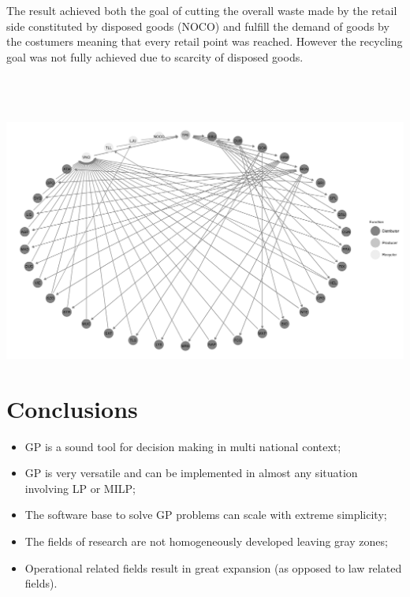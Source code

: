 \documentclass[a0,portrait]{a0poster}
\begin{document}
\begin{multicols}{2}
The result achieved both the goal of cutting the overall waste made by the retail side constituted by disposed goods (NOCO) and fulfill the demand of goods by the costumers meaning that every retail point was reached. However the recycling goal was not fully achieved due to scarcity of disposed goods.
\\
\\
\\
\\
\begin{center}\vspace{1cm}
\includegraphics[width=0.8\linewidth]{network.png}
\end{center}\vspace{1cm}

\color{SaddleBrown} %

\section*{Conclusions}

\begin{itemize}
\item GP is a sound tool for decision making in multi national context;
\item GP is very versatile and can be implemented in almost any situation involving LP or MILP;
\item The software base to solve GP problems can scale with extreme simplicity;
\item The fields of research are not homogeneously developed leaving gray zones;
\item Operational related fields result in great expansion (as opposed to law related fields).
\end{itemize}

\color{DarkSlateGray}


\end{multicols}
\end{document}
